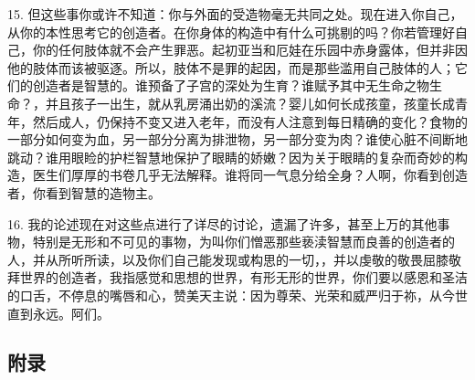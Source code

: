 15. 但这些事你或许不知道：你与外面的受造物毫无共同之处。现在进入你自己，从你的本性思考它的创造者。在你身体的构造中有什么可挑剔的吗？你若管理好自己，你的任何肢体就不会产生罪恶。起初亚当和厄娃在乐园中赤身露体，但并非因他的肢体而该被驱逐。所以，肢体不是罪的起因，而是那些滥用自己肢体的人；它们的创造者是智慧的。谁预备了子宫的深处为生育？谁赋予其中无生命之物生命？，并且孩子一出生，就从乳房涌出奶的溪流？婴儿如何长成孩童，孩童长成青年，然后成人，仍保持不变又进入老年，而没有人注意到每日精确的变化？食物的一部分如何变为血，另一部分分离为排泄物，另一部分变为肉？谁使心脏不间断地跳动？谁用眼睑的护栏智慧地保护了眼睛的娇嫩？因为关于眼睛的复杂而奇妙的构造，医生们厚厚的书卷几乎无法解释。谁将同一气息分给全身？人啊，你看到创造者，你看到智慧的造物主。\par

16. 我的论述现在对这些点进行了详尽的讨论，遗漏了许多，甚至上万的其他事物，特别是无形和不可见的事物，为叫你们憎恶那些亵渎智慧而良善的创造者的人，并从所听所读，以及你们自己能发现或构思的一切，，并以虔敬的敬畏屈膝敬拜世界的创造者，我指感觉和思想的世界，有形无形的世界，你们要以感恩和圣洁的口舌，不停息的嘴唇和心，赞美天主说：因为尊荣、光荣和威严归于祢，从今世直到永远。阿们。\par


\subsection{附录}

\par

\par

